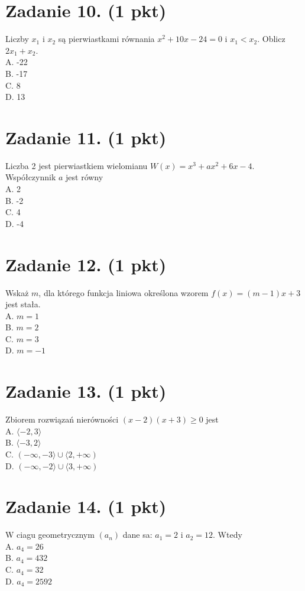 \documentclass[10pt]{article}
\begin{document}
\section*{Zadanie 10. (1 pkt)}
Liczby \(x_{1}\) i \(x_{2}\) są pierwiastkami równania \(x^{2}+10 x-24=0\) i \(x_{1}<x_{2}\). Oblicz \(2 x_{1}+x_{2}\).\\
A. -22\\
B. -17\\
C. 8\\
D. 13

\section*{Zadanie 11. (1 pkt)}
Liczba 2 jest pierwiastkiem wielomianu \(W(x)=x^{3}+a x^{2}+6 x-4\). Współczynnik \(a\) jest równy\\
A. 2\\
B. -2\\
C. 4\\
D. -4

\section*{Zadanie 12. (1 pkt)}
Wskaż \(m\), dla którego funkcja liniowa określona wzorem \(f(x)=(m-1) x+3\) jest stała.\\
A. \(m=1\)\\
B. \(m=2\)\\
C. \(m=3\)\\
D. \(m=-1\)

\section*{Zadanie 13. (1 pkt)}
Zbiorem rozwiązań nierówności \((x-2)(x+3) \geq 0\) jest\\
A. \(\langle-2,3\rangle\)\\
B. \(\langle-3,2\rangle\)\\
C. \((-\infty,-3\rangle \cup\langle 2,+\infty)\)\\
D. \((-\infty,-2\rangle \cup\langle 3,+\infty)\)

\section*{Zadanie 14. (1 pkt)}
W ciagu geometrycznym \(\left(a_{n}\right)\) dane sa: \(a_{1}=2\) i \(a_{2}=12\). Wtedy\\
A. \(a_{4}=26\)\\
B. \(a_{4}=432\)\\
C. \(a_{4}=32\)\\
D. \(a_{4}=2592\)
\end{document}
